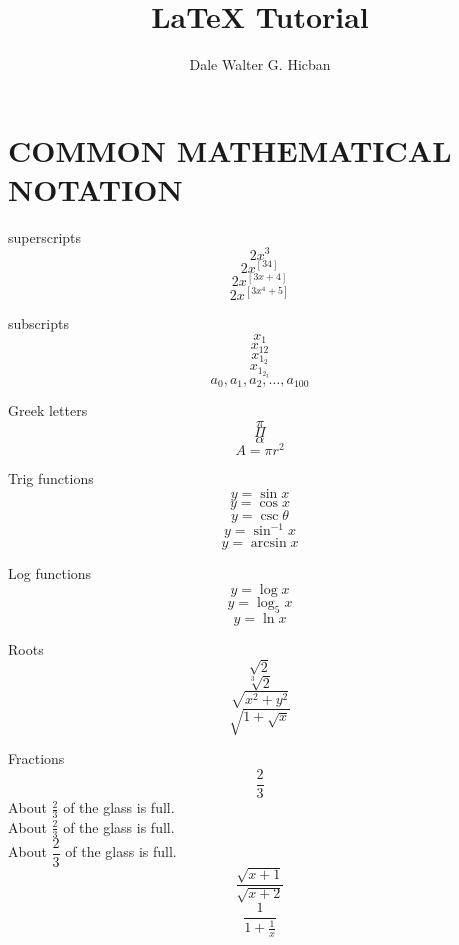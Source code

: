 \documentclass{article}
\title{LaTeX Tutorial}
\author{Dale Walter G. Hicban}
\begin{document}
\maketitle

\break

\section{COMMON MATHEMATICAL NOTATION}

superscripts $$2x^3$$
$$2x^[34]$$
$$2x^[  3x+4  ]$$
$$2x^[  3x^4+5  ]$$

subscripts
$$x_1$$
$$x_{12}$$
$$x_{1_2}$$
$$x_{  1_{2_3}  }$$
$$a_0, a_1, a_2, \ldots, a_{100}$$

Greek letters
$$\pi$$
$$\Pi$$
$$\alpha$$
$$A=\pi r^2$$

Trig functions
$$y=\sin x$$
$$y=\cos x$$
$$y=\csc \theta$$
$$y=\sin^{-1} x$$
$$y=\arcsin x$$

Log functions
$$y=\log x$$
$$y=\log_5 x$$
$$y=\ln x$$

Roots
$$\sqrt{2}$$
$$\sqrt[3]{2}$$
$$\sqrt{  x^2+y^2  }$$
$$\sqrt{ 1+\sqrt{x} }$$

Fractions
$$\frac{2}{3}$$
About $\frac{2}{3}$ of the glass is full.\\[6pt]
About $\displaystyle \frac{2}{3}$ of the glass is full.\\[6pt]
About $\dfrac{2}{3}$ of the glass is full.\\[6pt]

$$\frac{  \sqrt{x+1}  }{  \sqrt{x+2}  }$$
$$\frac{1}{  1+\frac{1}{x}  }$$\\[12pt]
\end{document}
